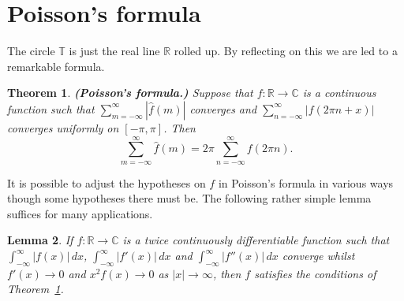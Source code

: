 \documentclass[12pt]{article}
\newtheorem{theorem}{Theorem}[section]
\newtheorem{lemma}[theorem]{Lemma}
\theoremstyle{definition}
\begin{document}
\section{Poisson's formula}\label{S, Poisson} 
The circle ${\mathbb T}$ is just
the real line ${\mathbb R}$ rolled up. By reflecting on this
we are led to a remarkable formula. 
\begin{theorem}\label{T, Poisson}{\bf (Poisson's formula.)}
Suppose that
$f:{\mathbb R}\rightarrow{\mathbb C}$ is a continuous
function such that $\sum_{m=-\infty}^{\infty}|\hat{f}(m)|$
converges and $\sum_{n=-\infty}^{\infty}|f(2\pi n+x)|$
converges uniformly on $[-\pi,\pi]$. Then
\[\sum_{m=-\infty}^{\infty}\hat{f}(m)=
2\pi\sum_{n=-\infty}^{\infty}f(2\pi n).\]
\end{theorem}
It is possible to adjust the hypotheses on $f$
in Poisson's formula in various ways
though some hypotheses there must be. The following
rather simple lemma suffices for many applications.
\begin{lemma}\label{L, simple needs}
If $f:{\mathbb R}\rightarrow{\mathbb C}$
is a twice continuously differentiable function such
that $\int_{-\infty}^{\infty}|f(x)|\,dx$,
$\int_{-\infty}^{\infty}|f'(x)|\,dx$
and $\int_{-\infty}^{\infty}|f''(x)|\,dx$
converge whilst $f'(x)\rightarrow 0$
and $x^{2}f(x)\rightarrow 0$ as $|x|\rightarrow\infty$,
then $f$ satisfies the conditions of Theorem~\ref{T, Poisson}.
\end{lemma}
\end{document}

